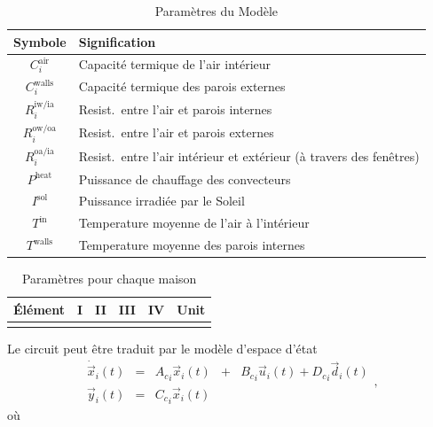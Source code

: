 \documentclass[../main.tex]{subfiles}
\begin{document}
\begin{table}[tb]
  \centering
  \caption{Paramètres du Modèle}\label{tab:modelParamMeaning_fr}
  \begin{tabular}[b]{cl}
    \toprule
    Symbole&Signification\\
    \midrule
    $C^{\text{air}}_{i}$  &Capacité termique de l'air intérieur\\
    $C^{\text{walls}}_{i}$ &Capacité termique des parois externes\\
    $R^{\text{iw/ia}}_{i}$ &Resist.\ entre l'air et parois internes\\
    $R^{\text{ow/oa}}_{i}$ &Resist.\ entre l'air et parois externes\\
    $R^{\text{oa/ia}}_{i}$ &Resist.\ entre l'air intérieur et extérieur (à travers des fenêtres)\\
    $P^{\text{heat}}$ &Puissance de chauffage des convecteurs\\
    $I^{\text{sol}}$ &Puissance irradiée par le Soleil\\
    $T^{\text{in}}$ &Temperature moyenne de l'air à l'intérieur\\
    $T^{\text{walls}}$ &Temperature moyenne des parois internes\\
    \bottomrule
  \end{tabular}
\end{table}

\begin{table}[b]
  \centering
  \caption{
    Paramètres pour chaque maison}\label{tab:modelParam_fr}
  \begin{tabular}[t]{cccccc} \toprule
    Élément& I & II & III & IV &Unit\\
    \midrule
    \\
    \bottomrule
  \end{tabular}
\end{table}

\pagebreak
Le circuit peut être traduit par le modèle d'espace d'état
  \begin{equation}
  \begin{matrix}
    \label{eq:systems_cont_fr}
    \dot{\vec{x}}_{i}(t)  &=&{A_{c}}_{i}\vec{x}_{i}(t) &+& {B_{c}}_{i}\vec{u}_{i}(t)+{D_{c}}_{i}\vec{d}_{i}(t)\\
    \vec{y}_{i}(t)        &=&{C_{c}}_{i}\vec{x}_{i}(t) &&
  \end{matrix},
\end{equation}
où
\end{document}
